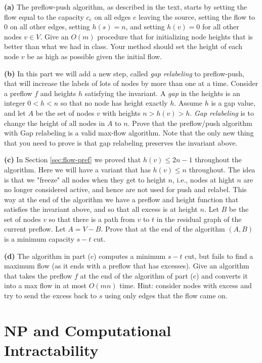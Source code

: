 \documentclass[12pt]{article}
\def\setminus{{-}}
\begin{document}
\begin{enumerate}
\medskip
{\bf (a)}
The preflow-push algorithm, as described in the text, starts by
setting the flow equal to the capacity $c_e$
on all edges $e$ leaving the source, setting the flow
to 0 on all other edges, setting $h(s)=n$, and setting $h(v)=0$ for all
other nodes $v \in V$. Give an $O(m)$ procedure that for initializing node
heights that is better than what we had in class. Your method should
set the height of each node $v$ be as high as possible given the initial
flow.

\medskip
{\bf (b)} In this part we will add a new step, called {\em gap relabeling}
to preflow-push, that will increase the labels of lots of nodes by more than
one at a time. Consider a preflow $f$ and heights $h$ satisfying the
invariant. A {\em gap} in the heights is an integer $0 < h< n$ so that no node
has height exactly $h$. Assume $h$ is a gap value, and let $A$ be the set of
nodes $v$ with heights $n > h(v) > h$. {\em Gap relabeling} is to change the
height of all nodes in $A$ to $n$. Prove that the preflow/push algorithm with
Gap relabeling is a valid max-flow algorithm. Note that the only new thing
that you need to prove is that gap relabeling preserves the invariant above.

\medskip
{\bf (c)} In Section \ref{sec:flow-pref} we proved that $h(v) \le 2n -1$
throughout the algorithm.  Here we will have a variant that has $h(v) \le n$
throughout. The idea is that we "freeze" all nodes when they get to height
$n$, i.e., nodes at hight
$n$ are no longer considered active, and hence are not used for push and
relabel. This way at the end of the algorithm we have a preflow and height
function that satisfies the invariant above, and so that all excess is at
height $n$. Let $B$ be the set of nodes $v$ so that there is a path from
$v$ to $t$ in the residual graph of the current preflow. Let
$A=V \setminus B$. Prove that at the end of the algorithm $(A,B)$ is a minimum
capacity $s-t$ cut.

\medskip
{\bf (d)} The algorithm in part (c) computes a minimum $s-t$ cut, but fails to
find a maximum flow (as it ends with a preflow that has excesses). Give an
algorithm that takes the preflow $f$ at the end of the algorithm of part (c)
and converts it into a max flow in at most $O(mn)$ time. Hint: consider nodes
with excess and try to send the excess back to $s$ using only edges that the
flow came on.


\end{enumerate}

\section{NP and Computational Intractability}
\end{document}
